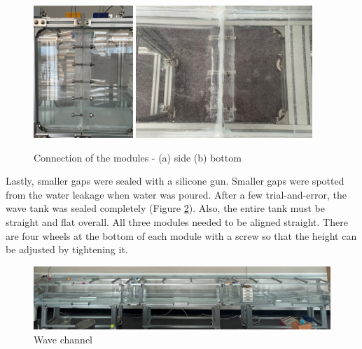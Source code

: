 \begin{figure}[H]
    \begin{center}
        \includegraphics[height=5cm]{images/Connection(Side).jpg}
        \includegraphics[height=5cm]{images/Connection(Silicone).jpg}
    \end{center}
        \caption{Connection of the modules - (a) side (b) bottom}
        \label{connection} 
\end{figure}

Lastly, smaller gaps were sealed with a silicone gun. Smaller gaps were spotted from the water leakage when water was poured. After a few trial-and-error, the wave tank was sealed completely (Figure \ref{wave channel}). Also, the entire tank must be straight and flat overall. All three modules needed to be aligned straight. There are four wheels at the bottom of each module with a screw so that the height can be adjusted by tightening it.

\begin{figure}[H]
    \centering
    \includegraphics[width=\textwidth]{images/Wave_Tank(without_Generator).jpg}
    \caption{Wave channel}
    \label{wave channel}
\end{figure}

